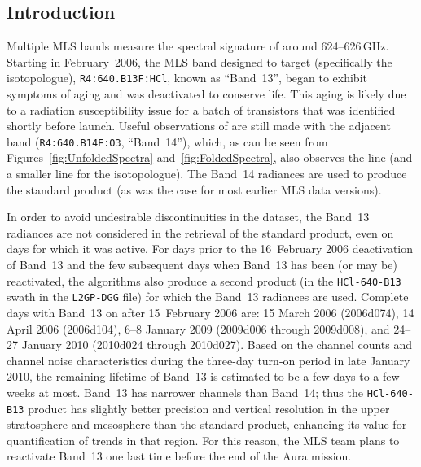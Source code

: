 
\subsection{Introduction}

Multiple MLS bands measure the spectral signature of  around 624--626\,GHz.  Starting in February~2006, the MLS band designed to target  (specifically the  isotopologue), \texttt{R4:640.B13F:HCl}, known as ``Band~13'', began to exhibit symptoms of aging and was deactivated to conserve life. This aging is likely due to a radiation susceptibility issue for a batch of transistors that was identified shortly before launch. Useful observations of  are still made with the adjacent band (\texttt{R4:640.B14F:O3}, ``Band~14''), which, as can be seen from Figures~\ref{fig:UnfoldedSpectra} and~\ref{fig:FoldedSpectra}, also observes the  line (and a smaller line for the  isotopologue). The Band~14 radiances are used to produce the \thisv standard  product (as was the case for most earlier MLS data versions).

In order to avoid undesirable discontinuities in the \thisv {} dataset, the Band~13 radiances are not considered in the retrieval of the standard  product, even on days for which it was active. For days prior to the 16~February 2006 deactivation of Band~13 and the few subsequent days when Band~13 has been (or may be) reactivated, the \thisv algorithms also produce a second  product (in the \texttt{HCl-640-B13} swath in the \texttt{L2GP-DGG} file) for which the Band~13 radiances are used. Complete days with Band~13 on after 15~February 2006 are: 15 March 2006 (2006d074), 14 April 2006 (2006d104), 6--8 January 2009 (2009d006 through 2009d008), and 24--27 January 2010 (2010d024 through 2010d027). Based on the channel counts and channel noise characteristics during the three-day turn-on period in late January 2010, the remaining lifetime of Band~13 is estimated to be a few days to a few weeks at most. Band~13 has narrower channels than Band~14; thus the \texttt{HCl-640-B13} product has slightly better precision and vertical resolution in the upper stratosphere and mesosphere than the standard  product, enhancing its value for quantification of trends in that region. For this reason, the MLS team plans to reactivate Band~13 one last time before the end of the Aura mission.

